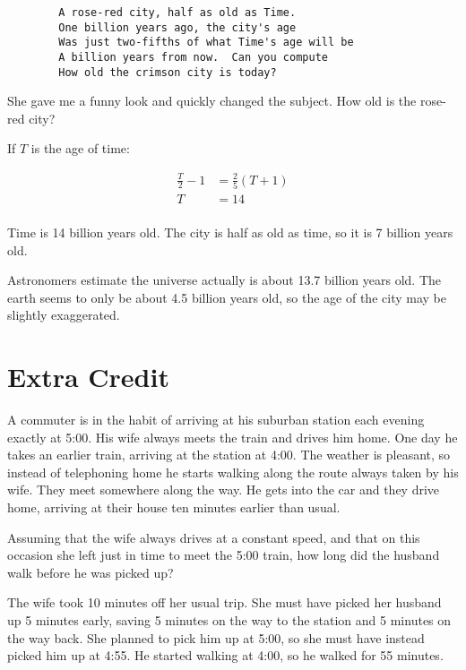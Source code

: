 \documentclass[letterpaper, landscape]{exam}
\begin{document}
\begin{questions}
      \begin{verbatim}
        A rose-red city, half as old as Time.
        One billion years ago, the city's age
        Was just two-fifths of what Time's age will be
        A billion years from now.  Can you compute
        How old the crimson city is today?
      \end{verbatim}

      She gave me a funny look and quickly changed the subject.  How old is the rose-red city?

      \begin{solution}
        If $T$ is the age of time:

        \begin{align*}
          \frac{T}{2} - 1 & = \frac{2}{5} (T + 1) \\
          T               & = 14 \\
        \end{align*}

        Time is 14 billion years old.  The city is half as old as time, so it is 7 billion years old.

        Astronomers estimate the universe actually is about 13.7 billion years old. The earth seems to only be
        about 4.5 billion years old, so the age of the city may be slightly exaggerated.

      \end{solution}
  \end{questions}

  \section{Extra Credit}

  A commuter is in the habit of arriving at his suburban station each evening exactly at 5:00.  His wife always meets
  the train and drives him home.  One day he takes an earlier train, arriving at the station at 4:00.  The weather is
  pleasant, so instead of telephoning home he starts walking along the route always taken by his wife.  They meet
  somewhere along the way.  He gets into the car and they drive home, arriving at their house ten minutes earlier than
  usual.  

  Assuming that the wife always drives at a constant speed, and that on this occasion she left just in time to meet
  the 5:00 train, how long did the husband walk before he was picked up?

  \begin{solution}
    The wife took 10 minutes off her usual trip.  She must have picked her husband up 5 minutes early, saving 5
    minutes on the way to the station and 5 minutes on the way back.  She planned to pick him up at 5:00, so she must
    have instead picked him up at 4:55.  He started walking at 4:00, so he walked for 55 minutes.
  \end{solution}
\end{document}
